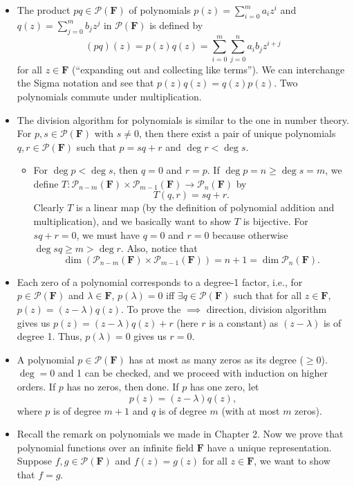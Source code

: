 \documentclass{article}
\newcommand{\F}{\mathbf{F}}
\renewcommand{\d}{\dim}
\newcommand{\PF}{\mathcal{P}(\F)}
\begin{document}
\begin{itemize}
	\item The product $pq \in \PF$ of polynomials $p(z)=\sum_{i=0}^m a_iz^i$ and $q(z)=\sum_{j=0}^m b_jz^j$ in $\PF$ is defined by $$(pq)(z) = p(z)q(z) = \sum_{i=0}^m\sum_{j=0}^n a_i b_j z^{i+j}$$ for all $z \in \F$ (``expanding out and collecting like terms''). We can interchange the Sigma notation and see that $p(z)q(z) = q(z)p(z)$. Two polynomials commute under multiplication.
    \item The division algorithm for polynomials is similar to the one in number theory. For $p,s \in \mathcal{P}(\F)$ with $s \not= 0$, then there exist a pair of unique polynomials $q,r \in \mathcal{P}(\F)$ such that $p=sq+r$ and $\deg r < \deg s$.
    \begin{itemize}
        \item For $\deg p < \deg s$, then $q = 0$ and $r = p$. If $\deg p = n \geq \deg s = m$, we define $T: \mathcal{P}_{n-m}(\F) \times \mathcal{P}_{m-1}(\F) \to \mathcal{P}_n(\F)$ by $$T(q,r) = sq+r.$$
        Clearly $T$ is a linear map (by the definition of polynomial addition and multiplication), and we basically want to show $T$ is bijective. For $sq+r=0$, we must have $q=0$ and $r=0$ because otherwise $\deg sq \geq m > \deg r$. Also, notice that $$\d(\mathcal{P}_{n-m}(\F) \times \mathcal{P}_{m-1}(\F)) = n+1 = \d \mathcal{P}_n(\F).$$
    \end{itemize}
    \item Each zero of a polynomial corresponds to a degree-1 factor, i.e., for $p \in \PF$ and $\lambda \in \F$, $p(\lambda) = 0$ iff $\exists q \in \PF$ such that for all $z \in \F$, $p(z) = (z-\lambda)q(z)$. To prove the $\implies$ direction, division algorithm gives us $p(z) = (z-\lambda)q(z) + r$ (here $r$ is a constant) as $(z-\lambda)$ is of degree 1. Thus, $p(\lambda) = 0$ gives us $r=0$.
    
    \item A polynomial $p \in \PF$ has at most as many zeros as its degree ($\geq 0$). $\deg = 0$ and 1 can be checked, and we proceed with induction on higher orders. If $p$ has no zeros, then done. If $p$ has one zero, let $$p(z) = (z-\lambda)q(z),$$ where $p$ is of degree $m+1$ and $q$ is of degree $m$ (with at most $m$ zeros).
    
    \item Recall the remark on polynomials we made in Chapter 2. Now we prove that polynomial functions over an infinite field $\F$ have a unique representation. Suppose $f,g \in \PF$ and $f(z)=g(z)$ for all $z \in \F$, we want to show that $f=g$.
    

\end{itemize}
\end{document}
